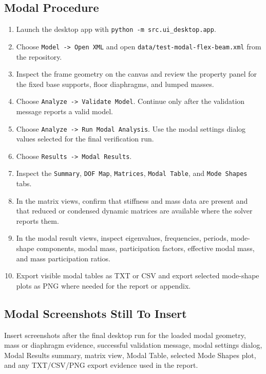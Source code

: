 \documentclass[11pt,a4paper]{article}
\begin{document}
\subsection{Modal Procedure}

\begin{enumerate}
\item Launch the desktop app with \texttt{python -m src.ui\_desktop.app}.
\item Choose \texttt{Model -> Open XML} and open \texttt{data/test-modal-flex-beam.xml} from the repository.
\item Inspect the frame geometry on the canvas and review the property panel for the fixed base supports, floor diaphragms, and lumped masses.
\item Choose \texttt{Analyze -> Validate Model}. Continue only after the validation message reports a valid model.
\item Choose \texttt{Analyze -> Run Modal Analysis}. Use the modal settings dialog values selected for the final verification run.
\item Choose \texttt{Results -> Modal Results}.
\item Inspect the \texttt{Summary}, \texttt{DOF Map}, \texttt{Matrices}, \texttt{Modal Table}, and \texttt{Mode Shapes} tabs.
\item In the matrix views, confirm that stiffness and mass data are present and that reduced or condensed dynamic matrices are available where the solver reports them.
\item In the modal result views, inspect eigenvalues, frequencies, periods, mode-shape components, modal mass, participation factors, effective modal mass, and mass participation ratios.
\item Export visible modal tables as TXT or CSV and export selected mode-shape plots as PNG where needed for the report or appendix.
\end{enumerate}

\subsection{Modal Screenshots Still To Insert}

Insert screenshots after the final desktop run for the loaded modal geometry, mass or diaphragm evidence, successful validation message, modal settings dialog, Modal Results summary, matrix view, Modal Table, selected Mode Shapes plot, and any TXT/CSV/PNG export evidence used in the report.
\end{document}
